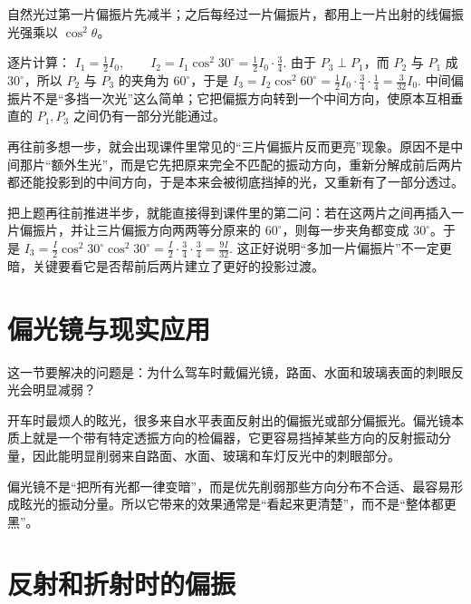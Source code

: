 \documentclass[lang=cn,11pt]{elegantbook}
\begin{document}
\begin{solution}
自然光过第一片偏振片先减半；之后每经过一片偏振片，都用上一片出射的线偏振光强乘以 \(\cos^2\theta\)。

逐片计算：
 \(I_1=\frac12 I_0,\qquad I_2=I_1\cos^2 30^\circ =\frac12 I_0\cdot\frac34.\) 
由于 \(P_3\perp P_1\)，而 \(P_2\) 与 \(P_1\) 成 \(30^\circ\)，所以 \(P_2\) 与 \(P_3\) 的夹角为 \(60^\circ\)，于是
 \(I_3=I_2\cos^2 60^\circ =\frac12 I_0\cdot\frac34\cdot\frac14 =\frac{3}{32}I_0.\) 
中间偏振片不是“多挡一次光”这么简单；它把偏振方向转到一个中间方向，使原本互相垂直的 \(P_1,P_3\) 之间仍有一部分光能通过。
\end{solution}

\begin{remark}
再往前多想一步，就会出现课件里常见的“三片偏振片反而更亮”现象。原因不是中间那片“额外生光”，而是它先把原来完全不匹配的振动方向，重新分解成前后两片都还能投影到的中间方向，于是本来会被彻底挡掉的光，又重新有了一部分透过。
\end{remark}

\begin{note}
把上题再往前推进半步，就能直接得到课件里的第二问：若在这两片之间再插入一片偏振片，并让三片偏振方向两两等分原来的 \(60^\circ\)，则每一步夹角都变成 \(30^\circ\)。于是
 \(I_3=\frac{I}{2}\cos^2 30^\circ \cos^2 30^\circ =\frac{I}{2}\cdot \frac34\cdot \frac34 =\frac{9I}{32}.\) 
这正好说明“多加一片偏振片”不一定更暗，关键要看它是否帮前后两片建立了更好的投影过渡。
\end{note}

\section{偏光镜与现实应用}

这一节要解决的问题是：为什么驾车时戴偏光镜，路面、水面和玻璃表面的刺眼反光会明显减弱？

开车时最烦人的眩光，很多来自水平表面反射出的偏振光或部分偏振光。偏光镜本质上就是一个带有特定透振方向的检偏器，它更容易挡掉某些方向的反射振动分量，因此能明显削弱来自路面、水面、玻璃和车灯反光中的刺眼部分。

\begin{note}
偏光镜不是“把所有光都一律变暗”，而是优先削弱那些方向分布不合适、最容易形成眩光的振动分量。所以它带来的效果通常是“看起来更清楚”，而不是“整体都更黑”。
\end{note}

\section{反射和折射时的偏振}
\end{document}

